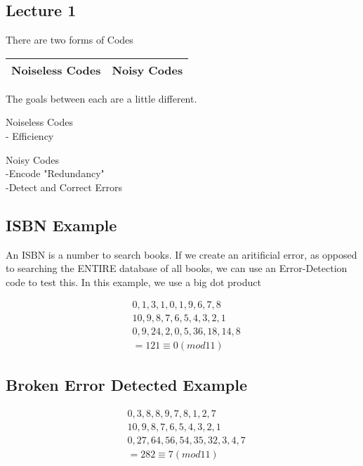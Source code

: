 \documentclass[12pt]{article}
\begin{document}
\begin{center}
    \section*{Lecture 1}
\end{center}

\noindent There are two forms of Codes
    \vspace{2mm}
    \begin{center}
        \begin{tabular}{ c|c }
            \hline
            Noiseless Codes & Noisy Codes\\
            \hline
        \end{tabular}
    \end{center}
The goals between each are a little different.
\begin{center}
    Noiseless Codes\\
    - Efficiency
\end{center}
\vspace{3mm}
\begin{center}
    Noisy Codes\\
    -Encode "Redundancy"\\
    -Detect and Correct Errors
\end{center}

\subsection*{ISBN Example}
An ISBN is a number to search books. If we create an aritificial error, as opposed to searching the ENTIRE database of all books, we can use an Error-Detection code to test this.
In this example, we use a big dot product

\begin{align*}
    & 0, 1, 3, 1, 0, 1, 9, 6, 7, 8 \\
    & 10, 9, 8, 7, 6, 5, 4, 3, 2, 1\\
    & 0, 9, 24, 2, 0, 5, 36, 18, 14, 8\\
    &= 121 \equiv 0 (mod 11)
\end{align*}

\subsection*{Broken Error Detected Example}

\begin{align*}
    & 0, 3, 8, 8, 9, 7, 8, 1, 2, 7\\
    & 10, 9, 8, 7, 6, 5, 4, 3, 2, 1\\
    & 0, 27, 64, 56, 54, 35, 32, 3, 4, 7\\
    &= 282 \equiv 7 (mod 11)
\end{align*}
\end{document}
